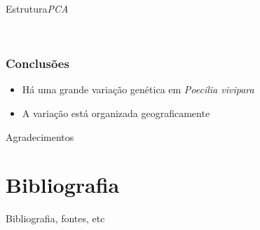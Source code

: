 \documentclass{beamer}
\begin{document}
\begin{frame}{ Estrutura}{\textit{PCA}}

    \centering
      \\

  
    \end{frame}

\begin{frame}
  \frametitle{Conclusões}

  \begin{itemize}[<+->]
\item Há uma grande varia\c{c}ão  genética em \textit{Poecilia vivipara}
\item A varia\c{c}ão está organizada geograficamente
\end{itemize}

 

\end{frame}



\begin{frame}{Agradecimentos}
  \centering

\end{frame}

\section*{Bibliografia}
\begin{frame}{Bibliografia, fontes, etc}
 \centering
\end{frame}
\end{document}
